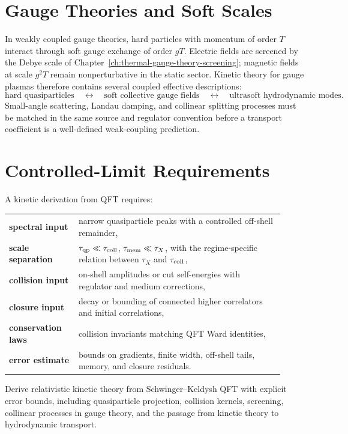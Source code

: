 \section{Gauge Theories and Soft Scales}

In weakly coupled gauge theories, hard particles with momentum of order \(T\)
interact through soft gauge exchange of order \(gT\).  Electric fields are
screened by the Debye scale of Chapter~\ref{ch:thermal-gauge-theory-screening};
magnetic fields at scale \(g^2T\) remain nonperturbative in the static
sector.  Kinetic theory for gauge plasmas therefore contains several
coupled effective descriptions:
\[
  \text{hard quasiparticles}
  \quad\leftrightarrow\quad
  \text{soft collective gauge fields}
  \quad\leftrightarrow\quad
  \text{ultrasoft hydrodynamic modes}.
\]
Small-angle scattering, Landau damping, and collinear splitting processes
must be matched in the same source and regulator convention before a
transport coefficient is a well-defined weak-coupling prediction.

\section{Controlled-Limit Requirements}

A kinetic derivation from QFT requires:
\begin{center}
\begin{tabular}{@{}p{0.23\linewidth}p{0.68\linewidth}@{}}
\textbf{spectral input} &
  narrow quasiparticle peaks with a controlled off-shell remainder,\\[0.25em]
\textbf{scale separation} &
  $\tau_{\rm qp}\ll\tau_{\rm coll}$, $\tau_{\rm mem}\ll\tau_X$, with the
  regime-specific relation between $\tau_X$ and $\tau_{\rm coll}$,\\[0.25em]
\textbf{collision input} &
  on-shell amplitudes or cut self-energies with regulator and medium
  corrections,\\[0.25em]
\textbf{closure input} &
  decay or bounding of connected higher correlators and initial
  correlations,\\[0.25em]
\textbf{conservation laws} &
  collision invariants matching QFT Ward identities,\\[0.25em]
\textbf{error estimate} &
  bounds on gradients, finite width, off-shell tails, memory, and closure
  residuals.
\end{tabular}
\end{center}

\begin{openproblem}
\label{op:qft-kinetic-theory-error-derivation}
Derive relativistic kinetic theory from Schwinger--Keldysh QFT with explicit
error bounds, including quasiparticle projection, collision kernels,
screening, collinear processes in gauge theory, and the passage from kinetic
theory to hydrodynamic transport.
\end{openproblem}
